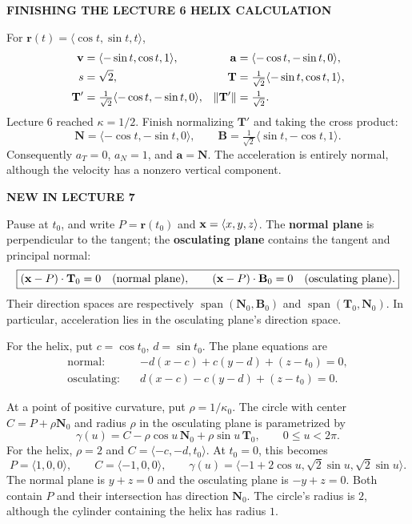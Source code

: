 \documentclass[11pt,letterpaper]{article}
\newcommand{\R}{\mathbf r}\newcommand{\V}{\mathbf v}\newcommand{\A}{\mathbf a}
\newcommand{\T}{\mathbf T}\newcommand{\N}{\mathbf N}\newcommand{\B}{\mathbf B}
\newcommand{\heading}[1]{\vspace{3pt}{\large\bfseries #1}\par}
\newcommand{\tagline}[1]{{\small\bfseries\color{inkblue}#1}\par}
\begin{document}
\newpage
\tagline{FINISHING THE LECTURE 6 HELIX CALCULATION}
\heading{The exact helix and its moving frame}
For $\R(t)=\langle\cos t,\sin t,t\rangle$,
\begin{align*}
 \V&=\langle-\sin t,\cos t,1\rangle,&
 \A&=\langle-\cos t,-\sin t,0\rangle,\\
 s&=\sqrt2,&
 \T&=\tfrac1{\sqrt2}\langle-\sin t,\cos t,1\rangle,\\
 \T'&=\tfrac1{\sqrt2}\langle-\cos t,-\sin t,0\rangle,&
 \norm{\T'}&=\tfrac1{\sqrt2}.
\end{align*}
Lecture 6 reached $\kappa=1/2$. Finish normalizing $\T'$ and taking the cross product:
\[
 \boxed{\N=\langle-\cos t,-\sin t,0\rangle,\qquad
 \B=\tfrac1{\sqrt2}\langle\sin t,-\cos t,1\rangle.}
\]
Consequently $a_T=0$, $a_N=1$, and $\A=\N$. The acceleration is entirely normal, although the velocity has a nonzero vertical component.

\tagline{NEW IN LECTURE 7}
\heading{Two planes attached to the moving point}
Pause at $t_0$, and write $P=\R(t_0)$ and $\mathbf x=\langle x,y,z\rangle$. The \textbf{normal plane} is perpendicular to the tangent; the \textbf{osculating plane} contains the tangent and principal normal:
\[
 \boxed{(\X-P)\cdot\T_0=0\quad\text{(normal plane)},\qquad
 (\X-P)\cdot\B_0=0\quad\text{(osculating plane)}.}
\]
Their direction spaces are respectively $\operatorname{span}(\N_0,\B_0)$ and $\operatorname{span}(\T_0,\N_0)$. In particular, acceleration lies in the osculating plane's direction space.

For the helix, put $c=\cos t_0$, $d=\sin t_0$. The plane equations are
\begin{align*}
 \text{normal:}\quad&-d(x-c)+c(y-d)+(z-t_0)=0,\\
 \text{osculating:}\quad&d(x-c)-c(y-d)+(z-t_0)=0.
\end{align*}
\heading{The osculating circle}
At a point of positive curvature, put $\rho=1/\kappa_0$. The circle with center $C=P+\rho\N_0$ and radius $\rho$ in the osculating plane is parametrized by
\[
 \boxed{\gamma(u)=C-\rho\cos u\,\N_0+\rho\sin u\,\T_0,
 \qquad 0\le u<2\pi.}
\]
For the helix, $\rho=2$ and $C=\langle-c,-d,t_0\rangle$. At $t_0=0$, this becomes
\[
 P=\langle1,0,0\rangle,\qquad C=\langle-1,0,0\rangle,\qquad
 \gamma(u)=\langle-1+2\cos u,\sqrt2\sin u,\sqrt2\sin u\rangle.
\]
The normal plane is $y+z=0$ and the osculating plane is $-y+z=0$. Both contain $P$ and their intersection has direction $\N_0$. The circle's radius is $2$, although the cylinder containing the helix has radius $1$.
\end{document}
